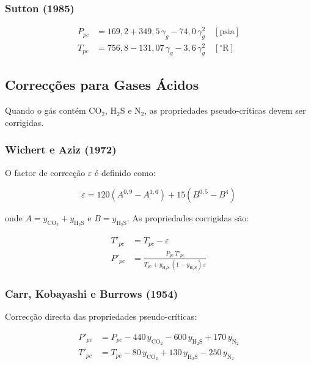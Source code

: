 \documentclass[12pt, a4paper]{article}
\begin{document}
\subsubsection{Sutton (1985)}

\begin{align}
  P_{pc} &= 169{,}2 + 349{,}5\,\gamma_g - 74{,}0\,\gamma_g^2
            \quad [\text{psia}] \\
  T_{pc} &= 756{,}8 - 131{,}07\,\gamma_g - 3{,}6\,\gamma_g^2
            \quad [^{\circ}\text{R}]
\end{align}

\subsection{Correcções para Gases Ácidos}

Quando o gás contém CO$_2$, H$_2$S e N$_2$, as propriedades pseudo-críticas
devem ser corrigidas.

\subsubsection{Wichert e Aziz (1972)}

O factor de correcção $\varepsilon$ é definido como:

\begin{equation}\label{eq:wichert}
  \varepsilon = 120\!\left(A^{0{,}9} - A^{1{,}6}\right)
                + 15\!\left(B^{0{,}5} - B^4\right)
\end{equation}

\noindent onde $A = y_{\text{CO}_2} + y_{\text{H}_2\text{S}}$ e
$B = y_{\text{H}_2\text{S}}$. As propriedades corrigidas são:

\begin{align}
  T'_{pc} &= T_{pc} - \varepsilon \\
  P'_{pc} &= \frac{P_{pc}\,T'_{pc}}{T_{pc} + y_{\text{H}_2\text{S}}\,(1 - y_{\text{H}_2\text{S}})\,\varepsilon}
\end{align}

\subsubsection{Carr, Kobayashi e Burrows (1954)}

Correcção directa das propriedades pseudo-críticas:

\begin{align}
  P'_{pc} &= P_{pc} - 440\,y_{\text{CO}_2} - 600\,y_{\text{H}_2\text{S}}
             + 170\,y_{\text{N}_2} \\
  T'_{pc} &= T_{pc} - 80\,y_{\text{CO}_2} + 130\,y_{\text{H}_2\text{S}}
             - 250\,y_{\text{N}_2}
\end{align}
\end{document}

